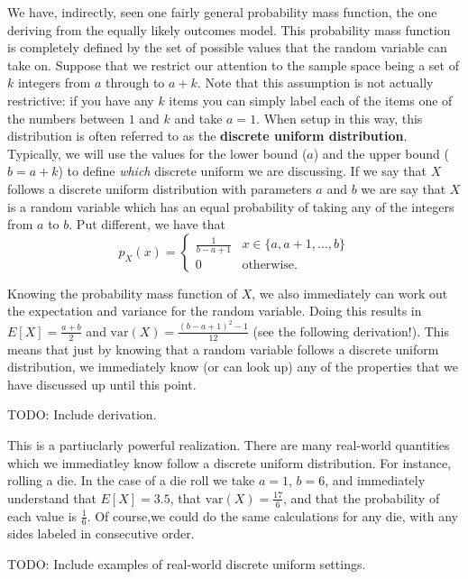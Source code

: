 \documentclass[
  letterpaper,
  DIV=11,
  numbers=noendperiod]{scrreprt}
\begin{document}
We have, indirectly, seen one fairly general probability mass function,
the one deriving from the equally likely outcomes model. This
probability mass function is completely defined by the set of possible
values that the random variable can take on. Suppose that we restrict
our attention to the sample space being a set of \(k\) integers from
\(a\) through to \(a+k\). Note that this assumption is not actually
restrictive: if you have any \(k\) items you can simply label each of
the items one of the numbers between \(1\) and \(k\) and take \(a=1\).
When setup in this way, this distribution is often referred to as the
\textbf{discrete uniform distribution}. Typically, we will use the
values for the lower bound (\(a\)) and the upper bound (\(b=a+k\)) to
define \emph{which} discrete uniform we are discussing. If we say that
\(X\) follows a discrete uniform distribution with parameters \(a\) and
\(b\) we are say that \(X\) is a random variable which has an equal
probability of taking any of the integers from \(a\) to \(b\). Put
different, we have that
\[p_X(x) = \begin{cases} \frac{1}{b-a+1} & x \in\{a,a+1,\dots,b\}\\ 0 & \text{otherwise}.\end{cases}\]

Knowing the probability mass function of \(X\), we also immediately can
work out the expectation and variance for the random variable. Doing
this results in \(E[X] = \frac{a+b}{2}\) and
\(\text{var}(X) = \frac{(b-a+1)^2-1}{12}\) (see the following
derivation!). This means that just by knowing that a random variable
follows a discrete uniform distribution, we immediately know (or can
look up) any of the properties that we have discussed up until this
point.

TODO: Include derivation.

This is a partiuclarly powerful realization. There are many real-world
quantities which we immediatley know follow a discrete uniform
distribution. For instance, rolling a die. In the case of a die roll we
take \(a=1\), \(b=6\), and immediately understand that \(E[X] = 3.5\),
that \(\text{var}(X) = \frac{17}{6}\), and that the probability of each
value is \(\frac{1}{6}\). Of course,we could do the same calculations
for any die, with any sides labeled in consecutive order.

TODO: Include examples of real-world discrete uniform settings.
\end{document}
